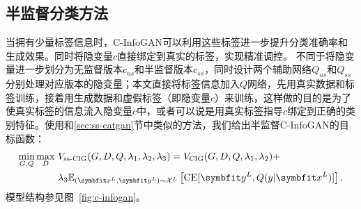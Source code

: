 \subsection{半监督分类方法}
当拥有少量标签信息时，C-InfoGAN可以利用这些标签进一步提升分类准确率和生成效果。同时将隐变量$c$直接绑定到真实的标签，实现精准调控。
不同于\citet{spurr2017guiding}将隐变量进一步划分为无监督版本$c_{us}$和半监督版本$c_{ss}$，同时设计两个辅助网络$Q_{us}$和$Q_{ss}$分别处理对应版本的隐变量；本文直接将标签信息加入$Q$网络，先用真实数据和标签训练，接着用生成数据和虚假标签（即隐变量$c$）来训练，这样做的目的是为了使真实标签的信息流入隐变量$c$中，或者可以说是用真实标签指导$c$绑定到正确的类别特征。使用和\ref{sec:ss-catgan}节中类似的方法，我们给出半监督C-InfoGAN的目标函数：
\begin{equation}
  \begin{split}
  \min_{G,Q}\max_D~ &V_{\text{ss-CIG}}(G,D,Q,\lambda_1,\lambda_2,\lambda_3) = 
  V_{\text{CIG}}(G,D,Q,\lambda_1,\lambda_2) + \\
  &\lambda_3 \E_{(\bd{x}^L, \bd{y}^L) \sim \mathcal{X}^L}
  \left[ \CE[\bd{y}^L, Q(y|\bd{x}^L)] \right].
  \end{split}
\end{equation}
模型结构参见图~\ref{fig:c-infogan}。

